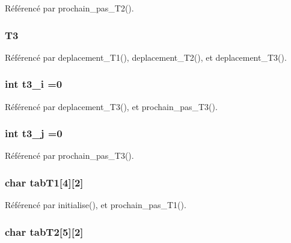 Référencé par prochain\+\_\+pas\+\_\+\+T2().

\subsubsection[{T3}]{ T3}\label{thread_8h_a79960566a6908cd12bcfec57c02e4981}


Référencé par deplacement\+\_\+\+T1(), deplacement\+\_\+\+T2(), et deplacement\+\_\+\+T3().

\subsubsection[{t3\+\_\+i}]{\setlength{\rightskip}{0pt plus 5cm}int t3\+\_\+i =0}\label{thread_8h_ade48de6836e075d2438d4318c2d384e1}


Référencé par deplacement\+\_\+\+T3(), et prochain\+\_\+pas\+\_\+\+T3().

\subsubsection[{t3\+\_\+j}]{\setlength{\rightskip}{0pt plus 5cm}int t3\+\_\+j =0}\label{thread_8h_a2abaab027ef8c5aba4299c98b8ce5ff6}


Référencé par prochain\+\_\+pas\+\_\+\+T3().

\subsubsection[{tab\+T1}]{\setlength{\rightskip}{0pt plus 5cm}char tab\+T1[4][2]}\label{thread_8h_a83a7ab050ef5f6001530bab2951d76f4}


Référencé par initialise(), et prochain\+\_\+pas\+\_\+\+T1().

\subsubsection[{tab\+T2}]{\setlength{\rightskip}{0pt plus 5cm}char tab\+T2[5][2]}\label{thread_8h_a937f8a083d2eb0ddf332cf0e0eaf6a9b}



